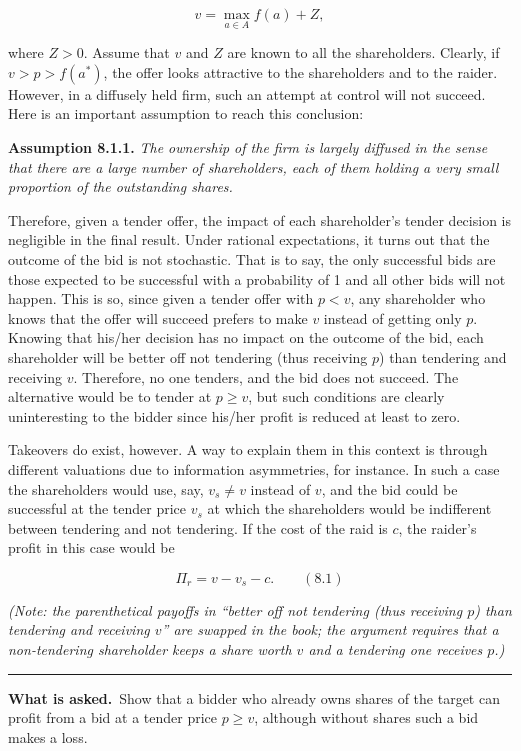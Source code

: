 \documentclass[11pt,a4paper]{article}
\newcommand{\asked}{\par\medskip\noindent\textbf{What is asked.}~}
\newcommand{\stmtend}{\par\endgroup\nopagebreak\noindent\rule{\linewidth}{0.4pt}\par\medskip}
\begin{document}
\[v = \max_{a \in A} f(a) + Z,\]

where \(Z > 0\). Assume that \(v\) and \(Z\) are known to all the shareholders. Clearly, if
\(v > p > f(a^*)\), the offer looks attractive to the shareholders and to the raider. However, in a
diffusely held firm, such an attempt at control will not succeed. Here is an important assumption to
reach this conclusion:

\textbf{Assumption 8.1.1.} \emph{The ownership of the firm is largely diffused in the sense that
there are a large number of shareholders, each of them holding a very small proportion of the
outstanding shares.}

Therefore, given a tender offer, the impact of each shareholder's tender decision is negligible in
the final result. Under rational expectations, it turns out that the outcome of the bid is not
stochastic. That is to say, the only successful bids are those expected to be successful with a
probability of 1 and all other bids will not happen. This is so, since given a tender offer with
\(p < v\), any shareholder who knows that the offer will succeed prefers to make \(v\) instead of
getting only \(p\). Knowing that his/her decision has no impact on the outcome of the bid, each
shareholder will be better off not tendering (thus receiving \(p\)) than tendering and receiving
\(v\). Therefore, no one tenders, and the bid does not succeed. The alternative would be to tender
at \(p \geq v\), but such conditions are clearly uninteresting to the bidder since his/her profit is
reduced at least to zero.

Takeovers do exist, however. A way to explain them in this context is through different valuations
due to information asymmetries, for instance. In such a case the shareholders would use, say,
\(v_s \neq v\) instead of \(v\), and the bid could be successful at the tender price \(v_s\) at
which the shareholders would be indifferent between tendering and not tendering. If the cost of the
raid is \(c\), the raider's profit in this case would be

\[\Pi_r = v - v_s - c. \qquad (8.1)\]

\emph{(Note: the parenthetical payoffs in ``better off not tendering (thus receiving \(p\)) than
tendering and receiving \(v\)'' are swapped in the book; the argument requires that a non-tendering
shareholder keeps a share worth \(v\) and a tendering one receives \(p\).)}
\stmtend

\asked Show that a bidder who already owns shares of the target can profit from a bid at a tender
price $p\ge v$, although without shares such a bid makes a loss.
\end{document}
